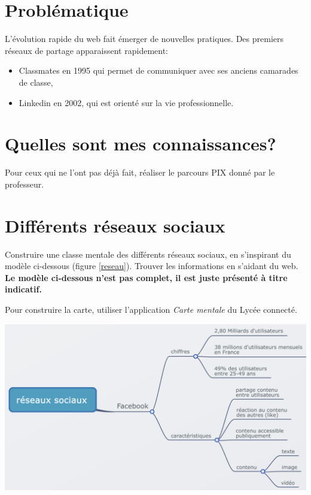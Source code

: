 \documentclass[a4paper,11pt]{article}
\begin{document}
\section{Problématique}
L'évolution rapide du web fait émerger de nouvelles pratiques. Des premiers réseaux de partage apparaissent rapidement:
\begin{itemize}
    \item Classmates en 1995 qui permet de communiquer avec ses anciens camarades de classe,
    \item Linkedin en 2002, qui est orienté sur la vie professionnelle.
\end{itemize}
\begin{center}
\end{center}
\section{Quelles sont mes connaissances?}
\begin{activite}
Pour ceux qui ne l'ont pas déjà fait, réaliser le parcours PIX donné par le professeur. 
\end{activite}
\section{Différents réseaux sociaux}
\begin{activite}
Construire une classe mentale des différents réseaux sociaux, en s'inspirant du modèle ci-dessous (figure \ref{reseau}). Trouver les informations en s'aidant du web. \textbf{Le modèle ci-dessous n'est pas complet, il est juste présenté à titre indicatif.}

Pour construire la carte, utiliser l'application \emph{Carte mentale} du Lycée connecté.
\begin{center}
    \centering
    \includegraphics[width=15cm]{ressources/carte-mentale.png}
    \label{reseau}
\end{center}
\end{activite}
\end{document}
